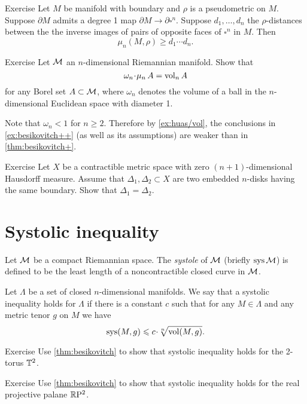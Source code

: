\begin{thm}{Exercise}\label{ex:besikovitch++}
Let $M$ be manifold with boundary and $\rho$ is a pseudometric on $M$.
Suppose $\partial M$ admits a degree 1 map $\partial M\to\partial\square^n$. 
Suppose $d_1,\dots, d_n$ the $\rho$-distances between the the inverse images of pairs of opposite faces of $\square^n$ in $M$.
Then 
\[\mu_n(M,\rho)\ge d_1\cdots d_n.\]
\end{thm}

\begin{thm}{Exercise}\label{ex:huas/vol}
Let $\mathcal{M}$ an $n$-dimensional Riemannian manifold.
Show that 
\[\omega_n\cdot\mu_n\,A=\vol_n A\]
for any Borel set $A\subset \mathcal{M}$, where $\omega_n$ denotes the volume of a ball in the $n$-dimensional Euclidean space with diameter 1.
\end{thm}

Note that $\omega_n<1$ for $n\ge 2$.
Therefore by \ref{ex:huas/vol}, the conclusions in \ref{ex:besikovitch++} (as well as its assumptions) are weaker than in \ref{thm:besikovitch+}.

\begin{thm}{Exercise}\label{}
Let $X$ be a contractible metric space with zero $(n+1)$-dimensional Hausdorff measure.
Assume that $\Delta_1,\Delta_2\subset X$ are two embedded $n$-disks having the same boundary.
Show that $\Delta_1=\Delta_2$.
\end{thm}

\section{Systolic inequality}

Let $\mathcal{M}$ be a compact Riemannian space.
The \emph{systole} of $\mathcal{M}$ (briefly $\mathop{\rm sys}\nolimits\mathcal{M}$) is defined to be the least length of a noncontractible closed curve in $\mathcal{M}$.

Let $\Lambda$ be a set of closed $n$-dimensional manifolds.
We say that a systolic inequality holds for $\Lambda$ if there is a constant $c$ such that for any $M\in \Lambda$ and any metric tenor $g$ on $M$ we have
\[\sys(M,g)\le c\cdot \sqrt[n]{\vol(M,g)}.\]

\begin{thm}{Exercise}\label{ex:sysT2}
Use \ref{thm:besikovitch} to show that systolic inequality holds for the 2-torus $\mathbb{T}^2$.
\end{thm}

\begin{thm}{Exercise}\label{ex:sysRP2}
Use \ref{thm:besikovitch} to show that systolic inequality holds for the real projective palane $\mathbb{R}\mathrm{P}^2$.
\end{thm}

